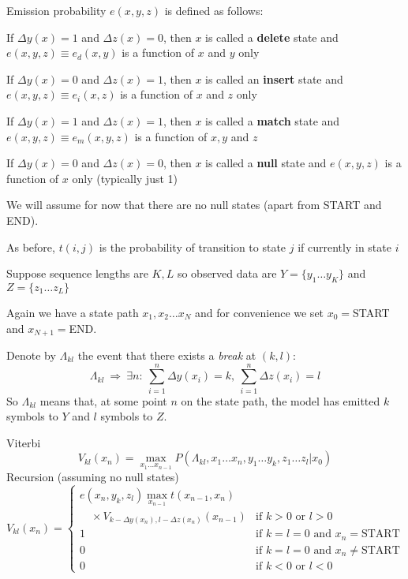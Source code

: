 \documentclass{beamer}
\begin{document}
\begin{frame}{}
\itemb
\item Emission probability $e(x,y,z)$ is defined as follows:
 \itemb
 \item If $\Delta y(x)=1$ and $\Delta z(x)=0$, then $x$ is called a {\bf delete} state and $e(x,y,z) \equiv e_d(x,y)$ is a function of $x$ and $y$ only
 \item If $\Delta y(x)=0$ and $\Delta z(x)=1$, then $x$ is called an {\bf insert} state and $e(x,y,z) \equiv e_i(x,z)$ is a function of $x$ and $z$ only
 \item If $\Delta y(x)=1$ and $\Delta z(x)=1$, then $x$ is called a {\bf match} state and $e(x,y,z) \equiv e_m(x,y,z)$ is a function of $x,y$ and $z$
 \item If $\Delta y(x)=0$ and $\Delta z(x)=0$, then $x$ is called a {\bf null} state and $e(x,y,z)$ is a function of $x$ only (typically just 1)
 \item We will assume for now that there are no null states
 (apart from START and END).
 \iteme
\iteme

\end{frame}

\begin{frame}{}

\itemb
\item As before, $t(i,j)$ is the probability of transition to state $j$ if currently in state $i$
\item Suppose sequence lengths are $K,L$ so observed data are $Y = \{ y_1 \ldots y_K \}$ and $Z = \{ z_1 \ldots z_L \}$
\item Again we have a state path $x_1, x_2 \ldots x_N$
 and for convenience we set $x_0=$START and $x_{N+1}=$END.
 \itemb
 \item Denote by $\Lambda_{kl}$ the event that there exists a {\em break} at $(k,l)$:
\[
\Lambda_{kl}\ \Rightarrow\ \exists n:
\ \sum_{i=1}^n \Delta y(x_i)=k,
\ \sum_{i=1}^n \Delta z(x_i)=l
\]
So $\Lambda_{kl}$ means that,
at some point $n$ on the state path, the model
has emitted $k$ symbols to $Y$ and $l$ symbols to $Z$.
 \iteme
\iteme

\end{frame}

\begin{frame}{}

\small
Viterbi
\[
V_{kl}(x_n) = \max_{x_1 \ldots x_{n-1}}
P \left( \Lambda_{kl},x_1 \ldots x_n,y_1 \ldots y_k,z_1 \ldots z_l | x_0 \right)
\]
Recursion (assuming no null states)
\[
V_{kl}(x_n) = \left\{ \begin{array}{ll} \displaystyle
e(x_n,y_k,z_l) \max_{x_{n-1}} t(x_{n-1},x_n) & \\ \quad \times
V_{k-\Delta y(x_n),l-\Delta z(x_n)}(x_{n-1}) & \mbox{if $k > 0$ or $l > 0$} \\
1 & \mbox{if $k=l=0$ and $x_n=$START} \\
0 & \mbox{if $k=l=0$ and $x_n\neq$START} \\
0 & \mbox{if $k < 0$ or $l < 0$}
\end{array} \right.
\]

\end{frame}
\end{document}
